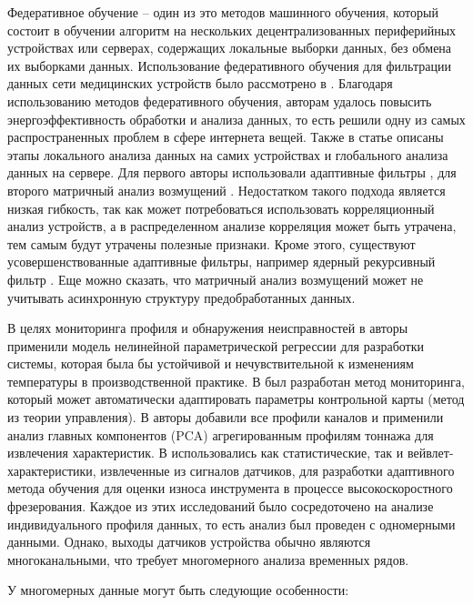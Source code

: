 Федеративное обучение -- один из это методов машинного обучения,
который состоит в обучении алгоритм на нескольких децентрализованных периферийных устройствах или серверах, 
содержащих локальные выборки данных, без обмена их выборками данных.
Использование федеративного обучения для фильтрации данных сети медицинских устройств было рассмотрено в \cite{8-paper}.
Благодаря использованию методов федеративного обучения, авторам удалось повысить энергоэффективность обработки и анализа данных,
то есть решили одну из самых распространенных проблем в сфере интернета вещей.
Также в статье описаны этапы локального анализа данных на самих устройствах и глобального анализа данных на сервере.
Для первого авторы использовали адаптивные фильтры \cite{adaptive-filter}, для второго матричный анализ возмущений \cite{pertuberation}.
Недостатком такого подхода является низкая гибкость, так как может потребоваться использовать корреляционный анализ устройств,
а в распределенном анализе корреляция может быть утрачена, тем самым будут утрачены полезные признаки.
Кроме этого, существуют усовершенствованные адаптивные фильтры, например ядерный рекурсивный фильтр \cite{krls-t}.
Еще можно сказать, что матричный анализ возмущений может не учитывать асинхронную структуру предобработанных данных.
 
В целях мониторинга профиля и обнаружения неисправностей в \cite{4-8} авторы применили модель нелинейной 
параметрической регрессии для разработки системы, которая была бы устойчивой и нечувствительной 
к изменениям температуры в производственной практике. 
В \cite{4-9} был разработан метод мониторинга, который может автоматически адаптировать параметры контрольной карты (метод из теории управления). 
В \cite{4-10} авторы добавили все профили каналов и применили анализ главных компонентов (PCA) 
агрегированным профилям тоннажа для извлечения характеристик. 
В \cite{4-12} использовались как статистические, 
так и вейвлет-характеристики, извлеченные из сигналов датчиков, 
для разработки адаптивного метода обучения для оценки износа инструмента в процессе высокоскоростного фрезерования. 
Каждое из этих исследований было сосредоточено на анализе индивидуального профиля данных, то есть анализ был проведен с одномерными данными.
Однако, выходы датчиков устройства обычно являются многоканальными, что требует многомерного анализа временных рядов.

У многомерных данные могут быть следующие особенности: \cite{wei-series}

